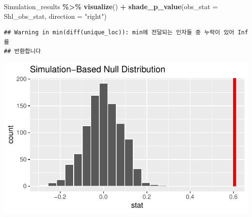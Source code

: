 \documentclass[
  11pt,
]{article}
\newenvironment{Shaded}{\begin{snugshade}}{\end{snugshade}}
\newcommand{\AttributeTok}[1]{\textcolor[rgb]{0.13,0.29,0.53}{#1}}
\newcommand{\FunctionTok}[1]{\textcolor[rgb]{0.13,0.29,0.53}{\textbf{#1}}}
\newcommand{\NormalTok}[1]{#1}
\newcommand{\SpecialCharTok}[1]{\textcolor[rgb]{0.81,0.36,0.00}{\textbf{#1}}}
\newcommand{\StringTok}[1]{\textcolor[rgb]{0.31,0.60,0.02}{#1}}
\begin{document}
\begin{Shaded}
\begin{Highlighting}[]
\NormalTok{Simulation\_results }\SpecialCharTok{\%\textgreater{}\%}
 \FunctionTok{visualize}\NormalTok{() }\SpecialCharTok{+}
 \FunctionTok{shade\_p\_value}\NormalTok{(}\AttributeTok{obs\_stat =}\NormalTok{ Shl\_obs\_stat, }\AttributeTok{direction =} \StringTok{"right"}\NormalTok{)}
\end{Highlighting}
\end{Shaded}

\begin{verbatim}
## Warning in min(diff(unique_loc)): min에 전달되는 인자들 중 누락이 있어 Inf를
## 반환합니다
\end{verbatim}

\begin{center}\includegraphics[width=0.7\linewidth]{SleepHelath_files/figure-latex/unnamed-chunk-60-1} \end{center}
\end{document}
